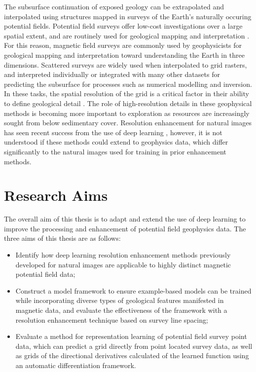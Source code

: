 % 
% 

The subsurface continuation of exposed geology can be extrapolated and interpolated using structures mapped in surveys of the Earth's naturally occuring potential fields.
Potential field surveys offer low-cost investigations over a large spatial extent, and are routinely used for geological mapping and interpretation \parencite{nabighian75thAnniversaryHistorical2005}.
For this reason, magnetic field surveys are commonly used by geophysicists for geological mapping and interpretation toward understanding the Earth in three dimensions.
Scattered surveys are widely used when interpolated to grid rasters, and interpreted individually or integrated with many other datasets for predicting the subsurface for processes such as numerical modelling and inversion.
In these tasks, the spatial resolution of the grid is a critical factor in their ability to define geological detail \parencite{islesGeologicalInterpretationAeromagnetic2018}.
The role of high-resolution details in these geophysical methods is becoming more important to exploration as resources are increasingly sought from below sedimentary cover.
Resolution enhancement for natural images has seen recent success from the use of deep learning \parencite{moserHitchhikerGuideSuperResolution2023}, however, it is not understood if these methods could extend to geophysics data, which differ significantly to the natural images used for training in prior enhancement methods.

\section{Research Aims}
The overall aim of this thesis is to adapt and extend the use of deep learning to improve the processing and enhancement of potential field geophysics data. The three aims of this thesis are as follows:

\begin{itemize}
    \item{} Identify how deep learning resolution enhancement methods previously developed for natural images are applicable to highly distinct magnetic potential field data;

    \item{} Construct a model framework to ensure example-based models can be trained while incorporating diverse types of geological features manifested in magnetic data, and evaluate the effectiveness of the framework with a resolution enhancement technique based on survey line spacing;

    \item{} Evaluate a method for representation learning of potential field survey point data, which can predict a grid directly from point located survey data, as well as grids of the directional derivatives calculated of the learned function using an automatic differentiation framework.
\end{itemize}

